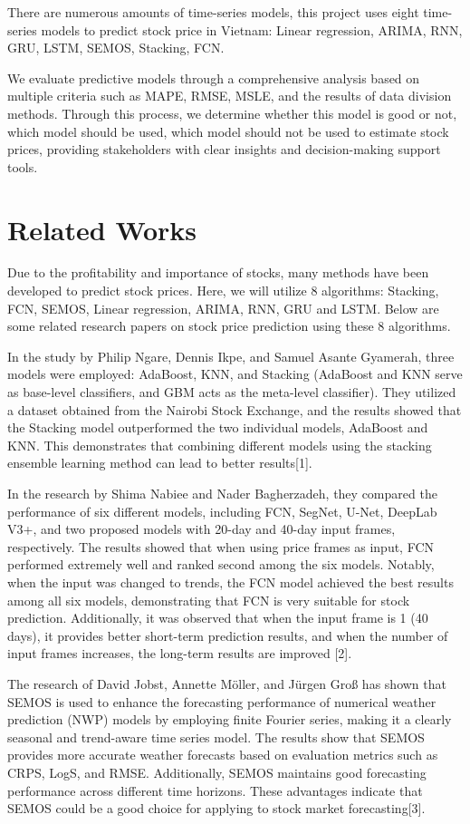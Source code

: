 \documentclass{ieeeojies}
\begin{document}
There are numerous amounts of time-series models, this project uses eight time-series models to predict stock price in Vietnam: Linear regression, ARIMA, RNN, GRU, LSTM, SEMOS, Stacking, FCN.

We evaluate predictive models through a comprehensive analysis based on multiple criteria such as MAPE, RMSE, MSLE, and the results of data division methods. Through this process, we determine whether this model is good or not, which model should be used, which model should not be used to estimate stock prices, providing stakeholders with clear insights and decision-making support tools.

\section{Related Works}

Due to the profitability and importance of stocks, many methods have been developed to predict stock prices. Here, we will utilize 8 algorithms: Stacking, FCN, SEMOS, Linear regression, ARIMA, RNN, GRU and LSTM. Below are some related research papers on stock price prediction using these 8 algorithms. 

In the study by Philip Ngare, Dennis Ikpe, and Samuel Asante Gyamerah, three models were employed: AdaBoost, KNN, and Stacking (AdaBoost and KNN serve as base-level classifiers, and GBM acts as the meta-level classifier). They utilized a dataset obtained from the Nairobi Stock Exchange, and the results showed that the Stacking model outperformed the two individual models, AdaBoost and KNN. This demonstrates that combining different models using the stacking ensemble learning method can lead to better results[1]. 

In the research by Shima Nabiee and Nader Bagherzadeh, they compared the performance of six different models, including FCN, SegNet, U-Net, DeepLab V3+, and two proposed models with 20-day and 40-day input frames, respectively. The results showed that when using price frames as input, FCN performed extremely well and ranked second among the six models. Notably, when the input was changed to trends, the FCN model achieved the best results among all six models, demonstrating that FCN is very suitable for stock prediction. Additionally, it was observed that when the input frame is 1 (40 days), it provides better short-term prediction results, and when the number of input frames increases, the long-term results are improved [2].

The research of David Jobst, Annette Möller, and Jürgen Groß has shown that  SEMOS is used to enhance the forecasting performance of numerical weather prediction (NWP) models by employing finite Fourier series, making it a clearly seasonal and trend-aware time series model. The results show that SEMOS provides more accurate weather forecasts based on evaluation metrics such as CRPS, LogS, and RMSE. Additionally, SEMOS maintains good forecasting performance across different time horizons. These advantages indicate that SEMOS could be a good choice for applying to stock market forecasting[3].
\end{document}
